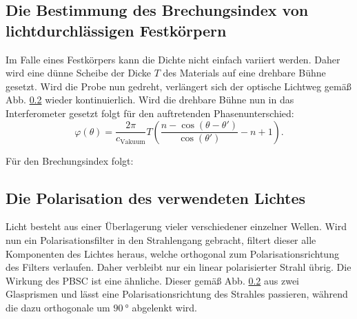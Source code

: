 \subsection{Die Bestimmung des Brechungsindex von lichtdurchlässigen Festkörpern}
Im Falle eines Festkörpers kann die Dichte nicht einfach variiert werden. Daher wird eine dünne Scheibe der Dicke $T$ des Materials auf eine drehbare Bühne gesetzt. Wird die Probe nun gedreht, verlängert sich der optische Lichtweg gemäß Abb. \ref{} wieder kontinuierlich. Wird die drehbare Bühne nun in das Interferometer gesetzt folgt für den auftretenden Phasenunterschied:
\begin{equation}
    \varphi(\theta) = \frac{2 \pi}{c_\text{Vakuum}} T \left( \frac{n - \cos(\theta - \theta ')}{\cos(\theta')} - n + 1 \right) \text{.} \label{eqn:phi}
\end{equation}

Für den Brechungsindex folgt:
\begin{equation}

\end{equation}
\subsection{Die Polarisation des verwendeten Lichtes}
Licht besteht aus einer Überlagerung vieler verschiedener einzelner Wellen. Wird nun ein Polarisationsfilter in den Strahlengang gebracht, filtert dieser alle Komponenten des Lichtes heraus, welche orthogonal zum Polarisationsrichtung des Filters verlaufen. Daher verbleibt nur ein linear polarisierter Strahl übrig. Die Wirkung des PBSC ist eine ähnliche. Dieser gemäß Abb. \ref{} aus zwei Glasprismen und lässt eine Polarisationsrichtung des Strahles passieren, während die dazu orthogonale um $\SI{90}{\degree}$ abgelenkt wird.  